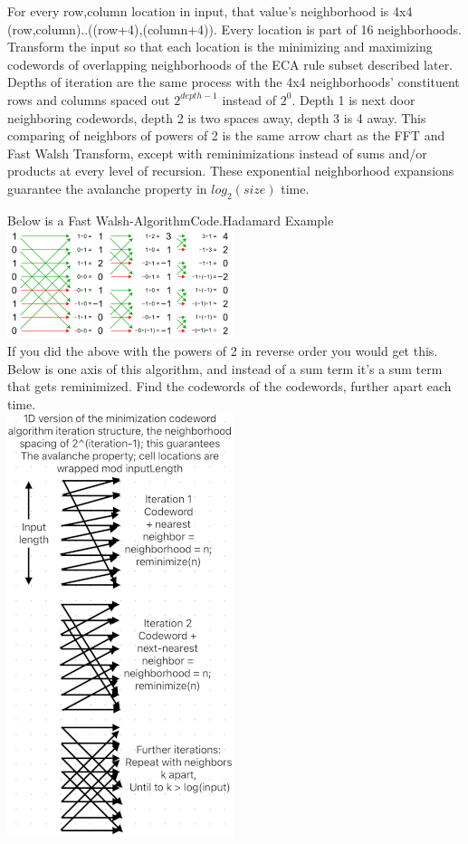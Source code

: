 \documentclass[11pt]{article}
\begin{document}
For every row,column location in input, that value's neighborhood is 4x4 (row,column)..((row+4),(column+4)). Every location is part of 16 neighborhoods. Transform the input so that each location is the minimizing and maximizing codewords of overlapping neighborhoods of the ECA rule subset described later.  Depths of iteration are the same process with the 4x4 neighborhoods' constituent rows and columns spaced out $2^{depth-1}$ instead of $2^{0}$. Depth 1 is next door neighboring codewords, depth 2 is two spaces away, depth 3 is 4 away. This comparing of neighbors of powers of 2 is the same arrow chart as the FFT and Fast Walsh Transform, except with reminimizations instead of sums and/or products at every level of recursion. These exponential neighborhood expansions guarantee the avalanche property in $log_2(size)$ time.\\
\begin{center}
Below is a Fast Walsh-AlgorithmCode.Hadamard Example \cite{enwiki:1261916659}\\
\includegraphics{FastWalshHadamard}\\
If you did the above with the powers of 2 in reverse order you would get this. Below is one axis of this algorithm, and instead of a sum term it's a sum term that gets reminimized. Find the codewords of the codewords, further apart each time.\\
\includegraphics{AlgoStruct}\\
\end{center}
\end{document}
